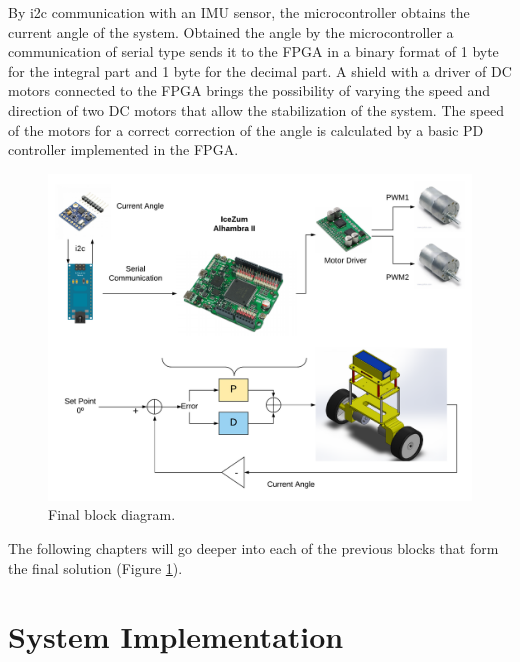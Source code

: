 By i2c communication with an IMU sensor, the microcontroller obtains the current angle of the system. Obtained the angle by the microcontroller a communication of serial type sends it to the FPGA in a binary format of 1 byte for the integral part and 1 byte for the decimal part. A shield with a driver of DC motors connected to the FPGA brings the possibility of varying the speed and direction of two DC motors that allow the stabilization of the system. The speed of the motors for a correct correction of the angle is calculated by a basic PD controller implemented in the FPGA.

\begin{center}
	\begin{figure}[H]
		\center
		\includegraphics[trim = 0mm 0mm 0mm 0mm,clip, angle=0, scale = 0.4]{imagenes/Balancing_Robot/final.pdf}
		\caption{Final block diagram.}
		\label{fig:final}
	\end{figure}
\end{center}


The following chapters will go deeper into each of the previous blocks that form the final solution (Figure \ref{fig:final}). 


\newpage
\section{System Implementation}\label{sec:Implementacion}
